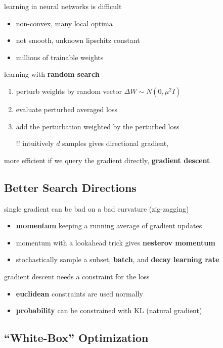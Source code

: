 \documentclass[]{article}
\theoremstyle{definition}
\begin{document}
    learning in neural networks is difficult
    \begin{itemize}
        \item non-convex, many local optima
        \item not smooth, unknown lipschitz constant
        \item millions of trainable weights
    \end{itemize}

    learning with \textbf{random search}
    \begin{enumerate}
        \item perturb weights by random vector $\Delta W \sim N(0,\mu^2I)$
        \item evaluate perturbed averaged loss
        \item add the perturbation weighted by the perturbed loss
        \item[!!] intuitively $d$ samples gives directional gradient,
    \end{enumerate}
    more efficient if we query the gradient directly, \textbf{gradient descent} \\

    \subsection{Better Search Directions}%
    \label{sub:better_search_directions}

    single gradient can be bad on a bad curvature (zig-zagging)
    \begin{itemize}
        \item \textbf{momentum} keeping a running average of gradient updates
        \item momentum with a lookahead trick gives \textbf{nesterov momentum}
        \item stochastically sample a subset, \textbf{batch}, and \textbf{decay learning rate}
    \end{itemize}

    gradient descent needs a constraint for the loss
    \begin{itemize}
        \item \textbf{euclidean} constraints are used normally
        \item \textbf{probability} can be constrained with KL (natural gradient)
    \end{itemize}

    \subsection{``White-Box'' Optimization}%
    \label{sub:_white_box_optimization}
\end{document}
